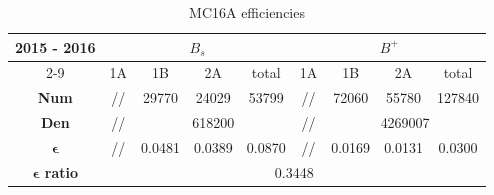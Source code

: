 \begin{table}[h]
\centering
\begin{tabular}{|c|cccccccc|}
\hline
\multirow{2}{*}{2015 - 2016}            & \multicolumn{4}{c|}{$B_s$}                                                                                        & \multicolumn{4}{c|}{$B^+$}                                                                   \\ \cline{2-9} 
                                       & \multicolumn{1}{c|}{1A} & \multicolumn{1}{c|}{1B}     & \multicolumn{1}{c|}{2A}     & \multicolumn{1}{c|}{total}  & \multicolumn{1}{c|}{1A} & \multicolumn{1}{c|}{1B}     & \multicolumn{1}{c|}{2A}     & total  \\ \hline
\textbf{Num}                           & \multicolumn{1}{c|}{//} & \multicolumn{1}{c|}{29770}  & \multicolumn{1}{c|}{24029}  & \multicolumn{1}{c|}{53799}  & \multicolumn{1}{c|}{//} & \multicolumn{1}{c|}{72060}  & \multicolumn{1}{c|}{55780}  & 127840 \\ \hline
\textbf{Den}                           & \multicolumn{1}{c|}{//} & \multicolumn{3}{c|}{618200}                                                             & \multicolumn{1}{c|}{//} & \multicolumn{3}{c|}{4269007}                                       \\ \hline
$\boldsymbol{\epsilon}$                & \multicolumn{1}{c|}{//} & \multicolumn{1}{c|}{0.0481} & \multicolumn{1}{c|}{0.0389} & \multicolumn{1}{c|}{0.0870} & \multicolumn{1}{c|}{//} & \multicolumn{1}{c|}{0.0169} & \multicolumn{1}{c|}{0.0131} & 0.0300 \\ \hline
\textbf{$\boldsymbol{\epsilon}$ ratio} & \multicolumn{8}{c|}{0.3448}                                                                                                                                                                                      \\ \hline
\end{tabular}
\caption{MC16A efficiencies}
\label{table::efficiencies MC16A}
\end{table}


